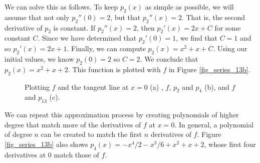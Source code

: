 We can solve this as follows. To keep $p_2(x)$ as simple as possible, we will assume that not only  $p_2''(0)=2$, but that $p_2''(x)=2$. That is, the second derivative of $p_2$ is  constant. If $p_2''(x) = 2$, then $p_2'(x) = 2x+C$ for some constant $C$. Since we have determined that $p_2'(0) = 1$, we find that $C=1$ and so $p_2'(x) = 2x+1$. Finally, we can compute $p_2(x) = x^2+x+C$. Using our initial values, we know $p_2(0) = 2$ so $C=2.$ We conclude that $p_2(x) = x^2+x+2.$ This function is plotted with $f$ in Figure \ref{fig_series_13b}.

\begin{figure}[t]
\centering
\qquad
{}
\qquad
{}
\caption{Plotting $f$ and the tangent line at $x=0$ (a) , $f$, $p_2$ and $p_4$ (b), and $f$ and $p_{13}$ (c).}
\end{figure}

We can repeat this approximation process by creating polynomials of higher degree that match more of the derivatives of $f$ at $x=0$. In general, a polynomial of degree $n$ can be created to match the first $n$ derivatives of $f$. Figure \ref{fig_series_13b} also shows $p_4(x)= -x^4/2-x^3/6+x^2+x+2$, whose first four derivatives at 0 match those of $f$. 

